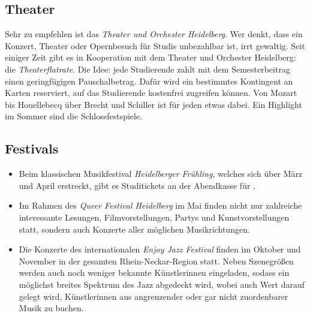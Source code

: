 \subsection{Theater}
Sehr zu empfehlen ist das \emph{Theater und Orchester Heidelberg}. Wer denkt, dass ein Konzert, Theater oder Opernbesuch für Studis unbezahlbar ist, irrt gewaltig. Seit einiger Zeit gibt es in Kooperation mit dem Theater und Orchester Heidelberg: die \textit{Theaterflatrate}. Die Idee: jede Studierende zahlt mit dem Semesterbeitrag einen geringfügigen Pauschalbetrag. Dafür wird ein bestimmtes Kontingent an Karten reserviert, auf das Studierende kostenfrei zugreifen können. Von Mozart bis Houellebecq über Brecht und Schiller ist für jeden etwas dabei. Ein Highlight im Sommer sind die Schlossfestspiele.


\subsection{Festivals}

\begin{itemize}
\item Beim klassischen Musikfestival \emph{Heidelberger Frühling}, welches sich über März und April erstreckt, gibt es Studitickets an der Abendkasse für .
\item Im Rahmen des \emph{Queer Festival Heidelberg} im Mai finden nicht nur zahlreiche interessante Lesungen, Filmvorstellungen, Partys und Kunstvorstellungen statt, sondern auch Konzerte aller möglichen Musikrichtungen.
\item Die Konzerte des internationalen \emph{Enjoy Jazz Festival} finden im Oktober und November in der gesamten Rhein-Neckar-Region statt. Neben Szenegrößen werden auch noch weniger bekannte Künstlerinnen eingeladen, sodass ein möglichst breites Spektrum des Jazz abgedeckt wird, wobei auch Wert darauf gelegt wird, Künstlerinnen aus angrenzender oder gar nicht zuordenbarer Musik zu buchen.
\end{itemize}
